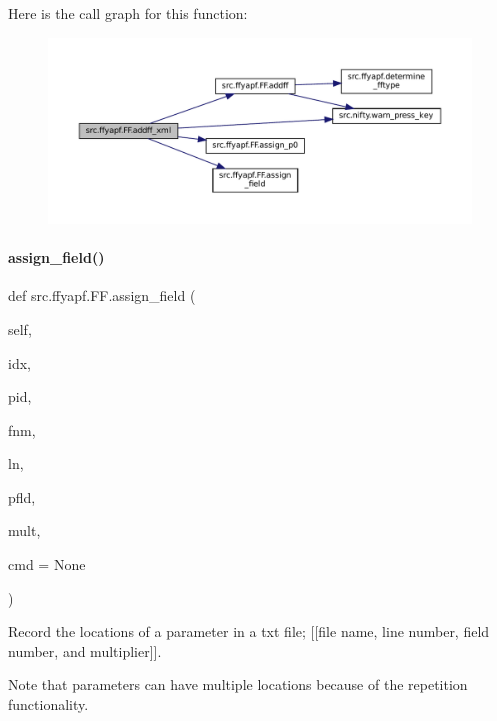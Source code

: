 Here is the call graph for this function\+:
\nopagebreak
\begin{figure}[H]
\begin{center}
\leavevmode
\includegraphics[width=350pt]{classsrc_1_1ffyapf_1_1FF_af943ddc128da40ca3007e78ac2cadfd9_cgraph}
\end{center}
\end{figure}
\mbox{\label{classsrc_1_1ffyapf_1_1FF_a30c65ab08a53066ebd3be85de9f2dfba}} 
\paragraph{\texorpdfstring{assign\+\_\+field()}{assign\_field()}}
{\footnotesize\ttfamily def src.\+ffyapf.\+F\+F.\+assign\+\_\+field (\begin{DoxyParamCaption}\item[{}]{self,  }\item[{}]{idx,  }\item[{}]{pid,  }\item[{}]{fnm,  }\item[{}]{ln,  }\item[{}]{pfld,  }\item[{}]{mult,  }\item[{}]{cmd = {\ttfamily None} }\end{DoxyParamCaption})}



Record the locations of a parameter in a txt file; \mbox{[}\mbox{[}file name, line number, field number, and multiplier\mbox{]}\mbox{]}. 

Note that parameters can have multiple locations because of the repetition functionality.


